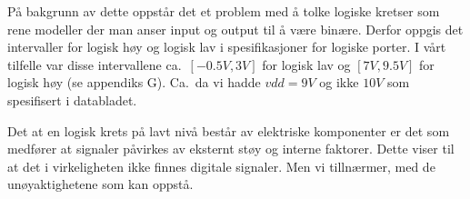     På bakgrunn av dette oppstår det et problem med å tolke logiske kretser som rene modeller der man anser input og output til å være binære.
    Derfor oppgis det intervaller for logisk høy og logisk lav i spesifikasjoner for logiske porter.
    I vårt tilfelle var disse intervallene ca.\ $[-0.5V, 3V]$ for logisk lav og $[7V, 9.5V]$ for logisk høy (se appendiks G).
    Ca.\ da vi hadde $vdd=9V$ og ikke $10V$ som spesifisert i databladet.

    Det at en logisk krets på lavt nivå består av elektriske komponenter er det som medfører at signaler påvirkes av eksternt støy og interne faktorer.
    Dette viser til at det i virkeligheten ikke finnes digitale signaler.
    Men vi tillnærmer, med de unøyaktighetene som kan oppstå.
